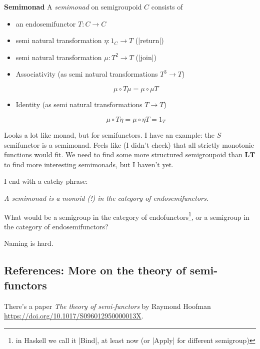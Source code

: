 \documentclass{article}
\begin{document}
\begin{definition}\textbf{Semimonad}
A \emph{semimonad} on semigroupoid $C$ consists of
\begin{itemize}
\item an endosemifunctor $T : C \to C$
\item semi natural transformation $\eta : 1_C \to T$ (|return|)
\item semi natural transformation $\mu : T^2 \to T$  (|join|)
\item Associativity (as semi natural transformations $T^3 \to T$)

\begin{equation}
\mu \circ T \mu = \mu \circ \mu T
\end{equation}

\item Identity (as semi natural transformations  $T \to T$)

\begin{equation}
\mu \circ T\eta = \mu \circ \eta T = 1_T
\end{equation}
\end{itemize}
\end{definition}

Looks a lot like monad, but for semifunctors. I have an example: the $S$ semifunctor
is a semimonad. Feels like (I didn't check) that all strictly monotonic functions would fit.
We need to find some more structured semigroupoid than $\mathbf{LT}$ to find more interesting semimonads, but I haven't yet.

I end with a catchy phrase:

\emph{A semimonad is a monoid (!) in the category of endosemifunctors.}

What would be a semigroup in the category of endofunctors\footnote{in Haskell we call it |Bind|, at least now (or |Apply| for different semigroup)}, or
a semigroup in the category of endosemifunctors?

Naming is hard.

\subsection{References: More on the theory of semi-functors}

There's a paper \emph{The theory of semi-functors} by
Raymond Hoofman \url{https://doi.org/10.1017/S096012950000013X}.
\end{document}
